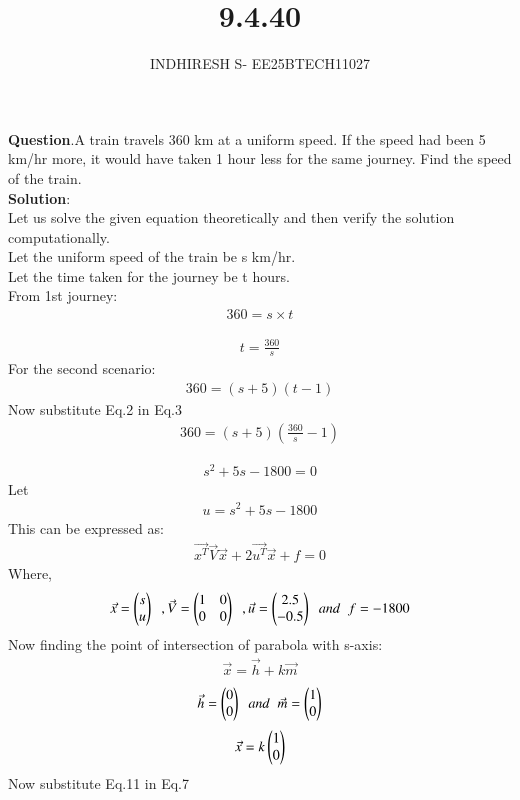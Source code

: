 \documentclass[journal]{IEEEtran}
\theoremstyle{remark}
\begin{document}

\onecolumn

\title{9.4.40}
\author{INDHIRESH S- EE25BTECH11027}
\maketitle


\renewcommand{\thefigure}{\theenumi}
\renewcommand{\thetable}{\theenumi}

\textbf{Question}.A train travels 360 km at a uniform speed. If the speed had been 5 km/hr more, it would have taken 1 hour less for the same journey. Find the speed of the train.\\
\textbf{Solution}:\\
Let us solve the given equation theoretically and then verify the solution computationally. \\
Let the uniform speed of the train be s km/hr.\\
Let the time taken for the journey be t hours.\\
From 1st journey:
\begin{align}
   360=s\times t
\end{align}


\begin{align}
  t=\frac{360}{s}
\end{align}
For the second scenario:
\begin{align}
 360=(s+5)(t-1)
\end{align}
Now substitute Eq.2 in Eq.3
\begin{align}
  360=(s+5)(\frac{360}{s}-1)
\end{align}

\begin{align}
  s^2+5s-1800=0
\end{align}
Let
\begin{align}
    u= s^2+5s-1800
\end{align}
This can be expressed as:
\begin{align}
  \Vec{x^T}\Vec{V}\Vec{x} + 2\Vec{u^T}\Vec{x} + f = 0
\end{align}
Where,
\begin{align}
    \Vec{x}=\begin{pmatrix}s\\u\end{pmatrix}\;\; ,\Vec{V}=\begin{pmatrix}1&0\\0&0\end{pmatrix}\;\;,\Vec{u}=\begin{pmatrix}2.5\\-0.5\end{pmatrix}\;\;and\;\;f=-1800
\end{align}
Now finding the point of intersection of parabola with s-axis:
\begin{align}
    \Vec{x}=\Vec{h}+k\Vec{m}
\end{align}
\begin{align}
    \Vec{h}=\begin{pmatrix}0\\0\end{pmatrix}\;\;and\;\;\Vec{m}=\begin{pmatrix}1\\0\end{pmatrix}
\end{align}
\begin{align}
    \Vec{x}=k\begin{pmatrix}1\\0\end{pmatrix}
\end{align}
Now substitute Eq.11 in Eq.7
\end{document}
